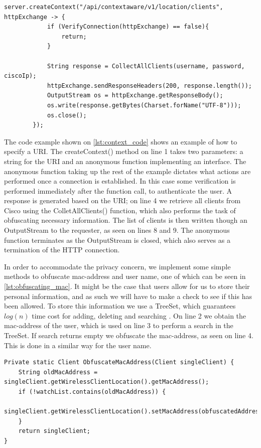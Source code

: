\begin{lstlisting}[caption={Adding a URI},label={lst:context_code},language=inc_Java]
server.createContext("/api/contextaware/v1/location/clients", httpExchange -> {
            if (VerifyConnection(httpExchange) == false){
                return;
            }

            String response = CollectAllClients(username, password, ciscoIp);
            httpExchange.sendResponseHeaders(200, response.length());
            OutputStream os = httpExchange.getResponseBody();
            os.write(response.getBytes(Charset.forName("UTF-8")));
            os.close();
        });
\end{lstlisting}
The code example shown on \cref{lst:context_code} shows an example of how to specify a URI. The createContext() method on line 1 takes two parameters: a string for the URI and an anonymous function implementing an interface. The anonymous function taking up the rest of the example dictates what actions are performed once a connection is established. In this case some verification is performed immediately after the function call, to authenticate the user. A response is generated based on the URI; on line 4 we retrieve all clients from Cisco using the ColletAllClients() function, which also performs the task of obfuscating necessary information. The list of clients is then written though an OutputStream to the requester, as seen on lines 8 and 9. The anonymous function terminates as the OutputStream is closed, which also serves as a termination of the HTTP connection. 

In order to accommodate the privacy concern, we implement some simple methods to obfuscate mac-address and user name, one of which can be seen in \cref{lst:obfuscating_mac}. It might be the case that users allow for us to store their personal information, and as such we will have to make a check to see if this has been allowed. To store this information we use a TreeSet, which guarantees $log(n)$ time cost for adding, deleting and searching \cite{treeset}. On line 2 we obtain the mac-address of the user, which is used on line 3 to perform a search in the TreeSet. If search returns empty we obfuscate the mac-address, as seen on line 4. This is done in a similar way for the user name.

\begin{lstlisting}[caption={Obfuscating mac-address},label={lst:obfuscating_mac},language=inc_Java]
Private static Client ObfuscateMacAddress(Client singleClient) {
    String oldMacAddress = singleClient.getWirelessClientLocation().getMacAddress();
    if (!watchList.contains(oldMacAddress)) {
        singleClient.getWirelessClientLocation().setMacAddress(obfuscatedAddress);
    }
    return singleClient;
}
\end{lstlisting}


